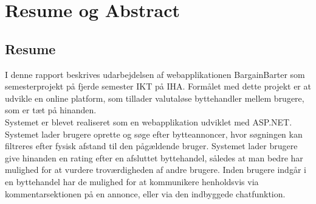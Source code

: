 \chapter{Resume og Abstract}


\section{Resume}
I denne rapport beskrives udarbejdelsen af webapplikationen BargainBarter som semesterprojekt på fjerde semester IKT på IHA. Formålet med dette projekt er at udvikle en online platform, som tillader valutaløse byttehandler mellem brugere, som er tæt på hinanden.
\\ Systemet er blevet realiseret som en webapplikation udviklet med ASP.NET. Systemet lader brugere oprette og søge efter bytteannoncer, hvor søgningen kan filtreres efter fysisk afstand til den pågældende bruger. Systemet lader brugere give hinanden en rating efter en afsluttet byttehandel, således at man bedre har mulighed for at vurdere troværdigheden af andre brugere. Inden brugere indgår i en byttehandel har de mulighed for at kommunikere henholdsvis via kommentarsektionen på en annonce, eller via den indbyggede chatfunktion.


